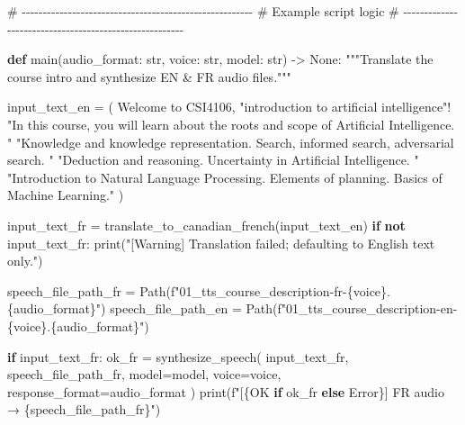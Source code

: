 \documentclass[
  letterpaper,
  DIV=11,
  numbers=noendperiod]{scrartcl}
\newenvironment{Shaded}{\begin{snugshade}}{\end{snugshade}}
\newcommand{\BuiltInTok}[1]{\textcolor[rgb]{0.00,0.23,0.31}{#1}}
\newcommand{\CommentTok}[1]{\textcolor[rgb]{0.37,0.37,0.37}{#1}}
\newcommand{\ControlFlowTok}[1]{\textcolor[rgb]{0.00,0.23,0.31}{\textbf{#1}}}
\newcommand{\KeywordTok}[1]{\textcolor[rgb]{0.00,0.23,0.31}{\textbf{#1}}}
\newcommand{\NormalTok}[1]{\textcolor[rgb]{0.00,0.23,0.31}{#1}}
\newcommand{\OperatorTok}[1]{\textcolor[rgb]{0.37,0.37,0.37}{#1}}
\newcommand{\SpecialCharTok}[1]{\textcolor[rgb]{0.37,0.37,0.37}{#1}}
\newcommand{\SpecialStringTok}[1]{\textcolor[rgb]{0.13,0.47,0.30}{#1}}
\newcommand{\StringTok}[1]{\textcolor[rgb]{0.13,0.47,0.30}{#1}}
\newcommand{\VariableTok}[1]{\textcolor[rgb]{0.07,0.07,0.07}{#1}}
\begin{document}
\begin{Shaded}
\begin{Highlighting}[]
\CommentTok{\# {-}{-}{-}{-}{-}{-}{-}{-}{-}{-}{-}{-}{-}{-}{-}{-}{-}{-}{-}{-}{-}{-}{-}{-}{-}{-}{-}{-}{-}{-}{-}{-}{-}{-}{-}{-}{-}{-}{-}{-}{-}{-}{-}{-}{-}{-}{-}{-}{-}{-}{-}{-}{-}{-}{-}}
\CommentTok{\# Example script logic}
\CommentTok{\# {-}{-}{-}{-}{-}{-}{-}{-}{-}{-}{-}{-}{-}{-}{-}{-}{-}{-}{-}{-}{-}{-}{-}{-}{-}{-}{-}{-}{-}{-}{-}{-}{-}{-}{-}{-}{-}{-}{-}{-}{-}{-}{-}{-}{-}{-}{-}{-}{-}{-}{-}{-}{-}{-}{-}}

\KeywordTok{def}\NormalTok{ main(audio\_format: }\BuiltInTok{str}\NormalTok{, voice: }\BuiltInTok{str}\NormalTok{, model: }\BuiltInTok{str}\NormalTok{) }\OperatorTok{{-}\textgreater{}} \VariableTok{None}\NormalTok{:}
    \CommentTok{"""Translate the course intro and synthesize EN \& FR audio files."""}

\NormalTok{    input\_text\_en }\OperatorTok{=}\NormalTok{ (}
        \StringTok{\textquotesingle{}Welcome to CSI4106, "introduction to artificial intelligence"! \textquotesingle{}}
        \StringTok{"In this course, you will learn about the roots and scope of Artificial Intelligence. "}
        \StringTok{"Knowledge and knowledge representation. Search, informed search, adversarial search. "}
        \StringTok{"Deduction and reasoning. Uncertainty in Artificial Intelligence. "}
        \StringTok{"Introduction to Natural Language Processing. Elements of planning. Basics of Machine Learning."}
\NormalTok{    )}

\NormalTok{    input\_text\_fr }\OperatorTok{=}\NormalTok{ translate\_to\_canadian\_french(input\_text\_en)}
    \ControlFlowTok{if} \KeywordTok{not}\NormalTok{ input\_text\_fr:}
        \BuiltInTok{print}\NormalTok{(}\StringTok{"[Warning] Translation failed; defaulting to English text only."}\NormalTok{)}

\NormalTok{    speech\_file\_path\_fr }\OperatorTok{=}\NormalTok{ Path(}\SpecialStringTok{f"01\_tts\_course\_description{-}fr{-}}\SpecialCharTok{\{}\NormalTok{voice}\SpecialCharTok{\}}\SpecialStringTok{.}\SpecialCharTok{\{}\NormalTok{audio\_format}\SpecialCharTok{\}}\SpecialStringTok{"}\NormalTok{)}
\NormalTok{    speech\_file\_path\_en }\OperatorTok{=}\NormalTok{ Path(}\SpecialStringTok{f"01\_tts\_course\_description{-}en{-}}\SpecialCharTok{\{}\NormalTok{voice}\SpecialCharTok{\}}\SpecialStringTok{.}\SpecialCharTok{\{}\NormalTok{audio\_format}\SpecialCharTok{\}}\SpecialStringTok{"}\NormalTok{)}

    \ControlFlowTok{if}\NormalTok{ input\_text\_fr:}
\NormalTok{        ok\_fr }\OperatorTok{=}\NormalTok{ synthesize\_speech(}
\NormalTok{            input\_text\_fr, speech\_file\_path\_fr, model}\OperatorTok{=}\NormalTok{model, voice}\OperatorTok{=}\NormalTok{voice, response\_format}\OperatorTok{=}\NormalTok{audio\_format}
\NormalTok{        )}
        \BuiltInTok{print}\NormalTok{(}\SpecialStringTok{f"[}\SpecialCharTok{\{}\StringTok{\textquotesingle{}OK\textquotesingle{}} \ControlFlowTok{if}\NormalTok{ ok\_fr }\ControlFlowTok{else} \StringTok{\textquotesingle{}Error\textquotesingle{}}\SpecialCharTok{\}}\SpecialStringTok{] FR audio → }\SpecialCharTok{\{}\NormalTok{speech\_file\_path\_fr}\SpecialCharTok{\}}\SpecialStringTok{"}\NormalTok{)}


\end{Highlighting}
\end{Shaded}
\end{document}

